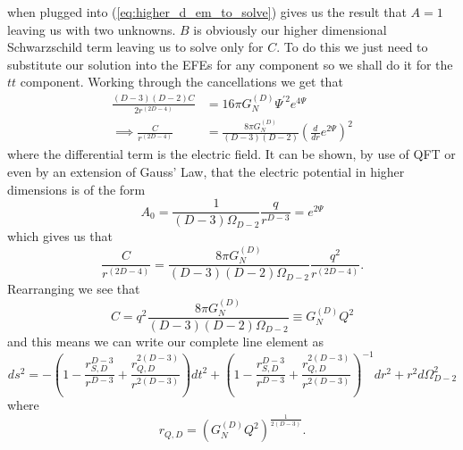 \documentclass[12pt]{article}
\numberwithin{equation}{section}
\numberwithin{figure}{section}
\begin{document}
when plugged into (\ref{eq:higher_d_em_to_solve}) gives us the result that $A=1$ leaving us with two unknowns. $B$ is obviously our higher dimensional Schwarzschild term leaving us to solve only for $C$. To do this we just need to substitute our solution into the EFEs for any component so we shall do it for the $tt$ component. Working through the cancellations we get that 
\begin{align}
	\frac{(D-3)(D-2)C}{2r^{(2D-4)}}&=16\pi G_{N}^{(D)} \Psi ^{\prime 2} e^{4\Psi}\\
	\implies \frac{C}{r^{(2D-4)}}&= \frac{8\pi G_{N}^{(D)}}{(D-3)(D-2)} \left(\frac{d}{dr}e^{2\Psi}\right)^{2}
\end{align}
where the differential term is the electric field. It can be shown, by use of QFT or even by an extension of Gauss' Law\cite{Zwiebach:789942}, that the electric potential in higher dimensions is of the form 
\begin{equation}
	A_{0}=\frac{1}{(D-3)\Omega_{D-2}}\frac{q}{r^{D-3}}=e^{2\Psi}
\end{equation}
which gives us that
\begin{equation}
	\frac{C}{r^{(2D-4)}}= \frac{8\pi G_{N}^{(D)}}{(D-3)(D-2)\Omega_{D-2}} \frac{q^{2}}{r^{(2D-4)}}.
\end{equation}
Rearranging we see that
\begin{equation}
	C=q^{2}\frac{8\pi G_{N}^{(D)}}{(D-3)(D-2)\Omega_{D-2}}\equiv{G_{N}^{(D)}Q^{2}}
\end{equation}
and this means we can write our complete line element as
\begin{equation}
	ds^2 =-\left(1- \frac{r_{S,D}^{D-3}}{r^{D-3}}+ \frac{r_{Q,D}^{2(D-3)}}{r^{2(D-3)}}	\right)dt^2 + \left(1- \frac{r_{S,D}^{D-3}}{r^{D-3}}+ \frac{r_{Q,D}^{2(D-3)}}{r^{2(D-3)}}	\right)^{-1}dr^2 + r^2 d{\Omega}^2_{D-2} \label{eq:RN_higher_dim_metric}
\end{equation}
where 
\begin{equation}
	r_{Q,D}=\left(G_{N}^{(D)}Q^{2}\right)^{\frac{1}{2(D-3)}}.
\end{equation}
\end{document}

